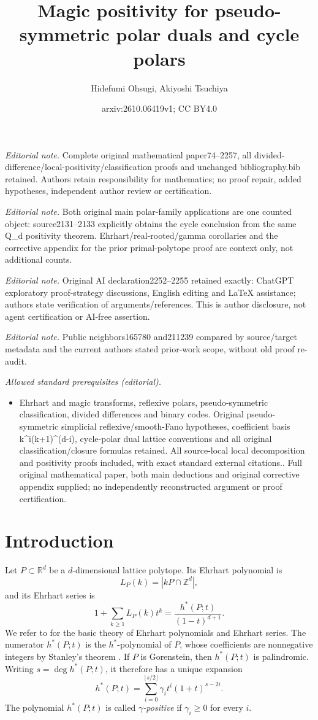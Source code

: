 \documentclass[10pt,a4paper]{amsart}
\title{Magic positivity for pseudo-symmetric polar duals and cycle polars}
\author{Hidefumi Ohsugi, Akiyoshi Tsuchiya}
\date{arxiv:2610.06419v1; CC BY4.0}
\theoremstyle{definition}
\newcommand{\ZZ}{\mathbb Z}
\newcommand{\RR}{\mathbb R}
\begin{document}
\maketitle
\noindent\textit{Editorial note.} Complete original mathematical paper74--2257, all divided-difference/local-positivity/classification proofs and unchanged bibliography.bib retained. Authors retain responsibility for mathematics; no proof repair, added hypotheses, independent author review or certification.\par\medskip
\noindent\textit{Editorial note.} Both original main polar-family applications are one counted object: source2131--2133 explicitly obtains the cycle conclusion from the same Q\_d positivity theorem. Ehrhart/real-rooted/gamma corollaries and the corrective appendix for the prior primal-polytope proof are context only, not additional counts.\par\medskip
\noindent\textit{Editorial note.} Original AI declaration2252--2255 retained exactly: ChatGPT exploratory proof-strategy discussions, English editing and LaTeX assistance; authors state verification of arguments/references. This is author disclosure, not agent certification or AI-free assertion.\par\medskip
\noindent\textit{Editorial note.} Public neighbors165780 and211239 compared by source/target metadata and the current authors stated prior-work scope, without old proof re-audit.\par\medskip
\noindent\textit{Allowed standard prerequisites (editorial).}\begin{itemize}
\item Ehrhart and magic transforms, reflexive polars, pseudo-symmetric classification, divided differences and binary codes. Original pseudo-symmetric simplicial reflexive/smooth-Fano hypotheses, coefficient basis k\textasciicircum{}i(k+1)\textasciicircum{}(d-i), cycle-polar dual lattice conventions and all original classification/closure formulas retained. All source-local local decomposition and positivity proofs included, with exact standard external citations.. Full original mathematical paper, both main deductions and original corrective appendix supplied; no independently reconstructed argument or proof certification.
\end{itemize}\medskip
\section{Introduction}

Let $P\subset\RR^d$ be a $d$-dimensional lattice polytope.  Its Ehrhart
polynomial is
\[
L_P(k)=|kP\cap\ZZ^d|,
\]
and its Ehrhart series is
\[
1+\sum_{k\ge1}L_P(k)t^k
=
\frac{h^*(P;t)}{(1-t)^{d+1}}.
\]
We refer to \cite{BeckRobins} for the basic theory of Ehrhart polynomials
and Ehrhart series.  The numerator $h^*(P;t)$ is the $h^*$-polynomial of
$P$, whose coefficients are nonnegative integers by Stanley's theorem
\cite{StanleyDecompositions}.  If $P$ is Gorenstein, then $h^*(P;t)$ is
palindromic.  Writing $s=\deg h^*(P;t)$, it therefore has a unique
expansion
\[
h^*(P;t)
=
\sum_{i=0}^{\lfloor s/2\rfloor}
\gamma_i t^i(1+t)^{s-2i}.
\]
The polynomial $h^*(P;t)$ is called \emph{$\gamma$-positive} if
$\gamma_i\ge0$ for every $i$.
\end{document}
